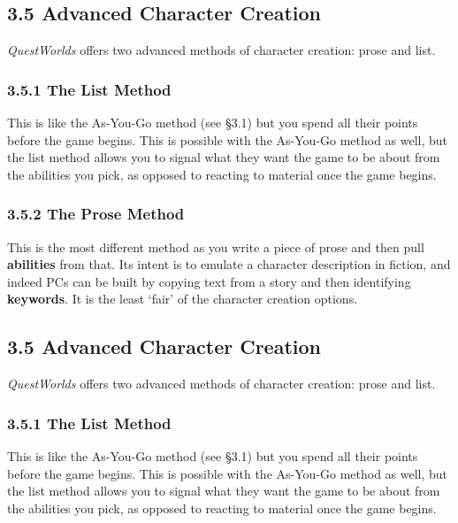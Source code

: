 \documentclass[
]{article}
\begin{document}
\hypertarget{advanced-character-creation}{%
\subsection{3.5 Advanced Character
Creation}\label{advanced-character-creation}}

\emph{QuestWorlds} offers two advanced methods of character creation:
prose and list.

\hypertarget{the-list-method}{%
\subsubsection{3.5.1 The List Method}\label{the-list-method}}

This is like the As-You-Go method (see §3.1) but you spend all their
points before the game begins. This is possible with the As-You-Go
method as well, but the list method allows you to signal what they want
the game to be about from the abilities you pick, as opposed to reacting
to material once the game begins.

\hypertarget{the-prose-method}{%
\subsubsection{3.5.2 The Prose Method}\label{the-prose-method}}

This is the most different method as you write a piece of prose and then
pull \textbf{abilities} from that. Its intent is to emulate a character
description in fiction, and indeed PCs can be built by copying text from
a story and then identifying \textbf{keywords}. It is the least `fair'
of the character creation options.

\hypertarget{advanced-character-creation-1}{%
\subsection{3.5 Advanced Character
Creation}\label{advanced-character-creation-1}}

\emph{QuestWorlds} offers two advanced methods of character creation:
prose and list.

\hypertarget{the-list-method-1}{%
\subsubsection{3.5.1 The List Method}\label{the-list-method-1}}

This is like the As-You-Go method (see §3.1) but you spend all their
points before the game begins. This is possible with the As-You-Go
method as well, but the list method allows you to signal what they want
the game to be about from the abilities you pick, as opposed to reacting
to material once the game begins.
\end{document}
